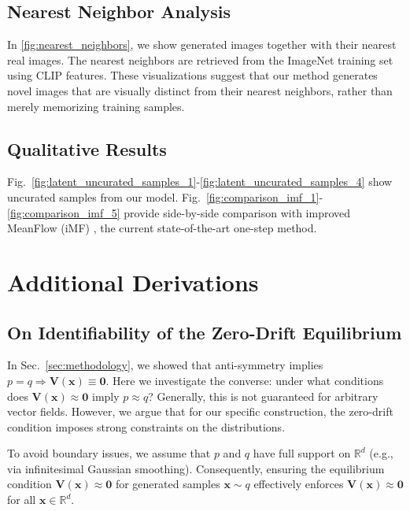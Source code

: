 \documentclass{article}
\newcommand{\vv}[1]{\mathbf{#1}}
\newcommand{\x}{\vv{x}}
\newcommand{\V}{\vv{V}}
\renewcommand{\paragraph}[1]{\vspace{.05em}\noindent\textbf{#1}}
\theoremstyle{plain}
\theoremstyle{definition}
\theoremstyle{remark}
\begin{document}
\subsection{Nearest Neighbor Analysis}

In \cref{fig:nearest_neighbors}, we show generated images together with their nearest real images. The nearest neighbors are retrieved from the ImageNet training set using CLIP features.
These visualizations suggest that our method generates novel images that are visually distinct from their nearest neighbors, rather than merely memorizing training samples.

\subsection{Qualitative Results}
\label{sec:appendix_qualitative_results}

Fig.~\ref{fig:latent_uncurated_samples_1}-\ref{fig:latent_uncurated_samples_4} show uncurated samples from our model.
Fig.~\ref{fig:comparison_imf_1}-\ref{fig:comparison_imf_5} provide side-by-side comparison with improved MeanFlow (iMF) \cite{geng2025improved}, the current state-of-the-art one-step method.

\section{Additional Derivations}

\subsection{On Identifiability of the Zero-Drift Equilibrium}
\label{sec:theory_identifiability}

In Sec.~\ref{sec:methodology}, we showed that anti-symmetry implies $p=q \Rightarrow \V(\x)\equiv \mathbf{0}$.
Here we investigate the converse: under what conditions does $\V(\x)\approx \mathbf{0}$ imply $p\approx q$?
Generally, this is not guaranteed for arbitrary vector fields.
However, we argue that for our specific construction, the zero-drift condition imposes strong constraints on the distributions.

To avoid boundary issues, we assume that $p$ and $q$ have full support on $\mathbb{R}^d$ (e.g., via infinitesimal Gaussian smoothing).
Consequently, ensuring the equilibrium condition $\V(\x) \approx \mathbf{0}$ for generated samples $\x \sim q$ effectively enforces $\V(\x) \approx \mathbf{0}$ for all $\x \in \mathbb{R}^d$.
\end{document}
